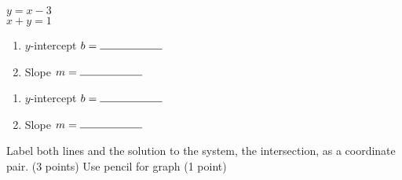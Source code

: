 \documentclass[12pt, twoside]{article}
\begin{document}
\begin{enumerate}
    \begin{multicols}{2}
      $y= x -3$ \\
      $x+y = 1 $
    \end{multicols}
    \begin{multicols}{2}
      \raggedcolumns
      \begin{enumerate}
        \item $y$-intercept $b= \rule{2cm}{0.15mm}$ \\[0.5cm]
        \item Slope \hspace{0.7cm} $m= \rule{2cm}{0.15mm}$\\[0.5cm]
      \end{enumerate}
      \begin{enumerate}
        \item $y$-intercept $b= \rule{2cm}{0.15mm}$ \\[0.5cm]
        \item Slope \hspace{0.7cm} $m= \rule{2cm}{0.15mm}$\\[0.5cm]
      \end{enumerate}
    \end{multicols}

    Label both lines and the solution to the system, the intersection, as a coordinate pair. (3 points) Use pencil for graph (1 point)\\

    \begin{center} %
    \end{center}

\end{enumerate}
\end{document}
